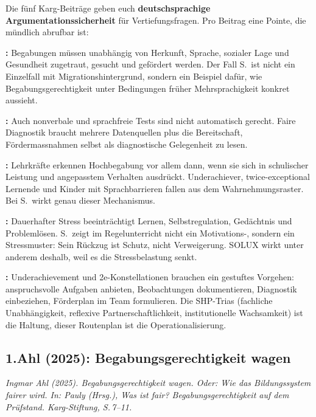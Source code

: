 \documentclass[ngerman, a4paper]{article}
\begin{document}
\begin{kapitelueberblick}
Die fünf Karg-Beiträge geben euch \textbf{deutschsprachige Argumentationssicherheit}
für Vertiefungsfragen. Pro Beitrag eine Pointe, die mündlich abrufbar ist:

\medskip\textbf{\textcite{ahl2025begabungsgerechtigkeit}:} Begabungen müssen
unabhängig von Herkunft, Sprache, sozialer Lage und Gesundheit zugetraut,
gesucht und gefördert werden. Der Fall S.\ ist nicht ein Einzelfall mit
Migrationshintergrund, sondern ein Beispiel dafür, wie Begabungsgerechtigkeit
unter Bedingungen früher Mehrsprachigkeit konkret aussieht.

\medskip\textbf{\textcite{koop2025herkunft}:} Auch nonverbale und sprachfreie
Tests sind nicht automatisch gerecht. Faire Diagnostik braucht mehrere
Datenquellen plus die Bereitschaft, Fördermassnahmen selbst als diagnostische
Gelegenheit zu lesen.

\medskip\textbf{\textcite{baudson2025besserfinden}:} Lehrkräfte erkennen
Hochbegabung vor allem dann, wenn sie sich in schulischer Leistung und
angepasstem Verhalten ausdrückt. Underachiever, twice-exceptional Lernende und
Kinder mit Sprachbarrieren fallen aus dem Wahrnehmungsraster. Bei S.\ wirkt
genau dieser Mechanismus.

\medskip\textbf{\textcite{evers2025stress}:} Dauerhafter Stress beeinträchtigt
Lernen, Selbstregulation, Gedächtnis und Problemlösen. S.\ zeigt im
Regelunterricht nicht ein Motivations-, sondern ein Stressmuster: Sein Rückzug
ist Schutz, nicht Verweigerung. SOLUX wirkt unter anderem deshalb, weil es die
Stressbelastung senkt.

\medskip\textbf{\textcite{ziesenitz2024routenplan}:} Underachievement und
2e-Konstellationen brauchen ein gestuftes Vorgehen: anspruchsvolle Aufgaben
anbieten, Beobachtungen dokumentieren, Diagnostik einbeziehen, Förderplan im
Team formulieren. Die SHP-Trias (fachliche Unabhängigkeit, reflexive
Partnerschaftlichkeit, institutionelle Wachsamkeit) ist die Haltung, dieser
Routenplan ist die Operationalisierung.
\end{kapitelueberblick}


\subsection*{1.\quad Ahl (2025): Begabungsgerechtigkeit wagen}

\textit{Ingmar Ahl (2025). Begabungsgerechtigkeit wagen. Oder: Wie das
Bildungssystem fairer wird. In: Pauly (Hrsg.), Was ist fair?
Begabungsgerechtigkeit auf dem Prüfstand. Karg-Stiftung, S.\,7--11.}
\end{document}
